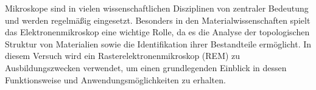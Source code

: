 Mikroskope sind in vielen wissenschaftlichen Disziplinen von zentraler Bedeutung und werden regelmäßig eingesetzt. 
Besonders in den Materialwissenschaften spielt das Elektronenmikroskop eine wichtige Rolle, da es die Analyse der topologischen Struktur von Materialien sowie die Identifikation ihrer Bestandteile ermöglicht. 
In diesem Versuch wird ein Rasterelektronenmikroskop (REM) zu Ausbildungszwecken verwendet, um einen grundlegenden Einblick in dessen Funktionsweise und Anwendungsmöglichkeiten zu erhalten.      